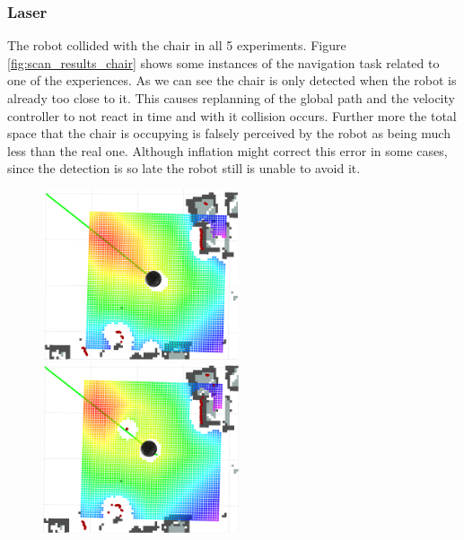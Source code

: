 \subsubsection{Laser}
The robot collided with the chair in all 5 experiments. Figure \ref{fig:scan_results_chair} shows some instances of the navigation task related to one of the experiences. As we can see the chair is only detected when the robot is already too close to it. This causes replanning of the global path and the velocity controller to not react in time and with it collision occurs. Further more the total space that the chair is occupying is falsely perceived by the robot as being much less than the real one. Although inflation might correct this error in some cases, since the detection is so late the robot still is unable to avoid it.
\begin{figure}[h] 
    \begin{minipage}[b]{.32\linewidth}
        \includegraphics[height=5cm,width=\linewidth]{imgs/chapter5/scan1.png}
    \end{minipage}
    \begin{minipage}[b]{.32\linewidth}
        \includegraphics[height=5cm,width=\linewidth]{imgs/chapter5/scan2.png}
    \end{minipage}
     \begin{minipage}[b]{.32\linewidth}

\end{minipage}
\end{figure}
